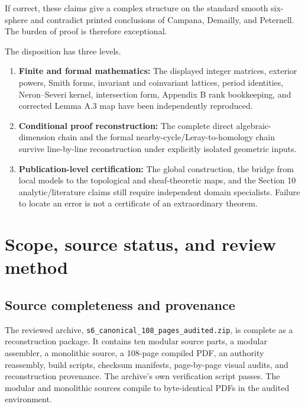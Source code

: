 \documentclass[
  10pt,
  letterpaper,
]{article}
\providecommand{\tightlist}{%
  \setlength{\itemsep}{0pt}\setlength{\parskip}{0pt}}
\begin{document}
If correct, these claims give a complex structure on the standard smooth
six-sphere and contradict printed conclusions of Campana, Demailly, and
Peternell. The burden of proof is therefore exceptional.

The disposition has three levels.

\begin{enumerate}
\def\labelenumi{\arabic{enumi}.}
\tightlist
\item
  \textbf{Finite and formal mathematics:} The displayed integer
  matrices, exterior powers, Smith forms, invariant and coinvariant
  lattices, period identities, Neron--Severi kernel, intersection form,
  Appendix B rank bookkeeping, and corrected Lemma A.3 map have been
  independently reproduced.
\item
  \textbf{Conditional proof reconstruction:} The complete direct
  algebraic-dimension chain and the formal
  nearby-cycle/Leray-to-homology chain survive line-by-line
  reconstruction under explicitly isolated geometric inputs.
\item
  \textbf{Publication-level certification:} The global construction, the
  bridge from local models to the topological and sheaf-theoretic maps,
  and the Section 10 analytic/literature claims still require
  independent domain specialists. Failure to locate an error is not a
  certificate of an extraordinary theorem.
\end{enumerate}

\section{Scope, source status, and review
method}\label{scope-source-status-and-review-method}

\subsection{Source completeness and
provenance}\label{source-completeness-and-provenance}

The reviewed archive, \texttt{s6\_canonical\_108\_pages\_audited.zip},
is complete as a reconstruction package. It contains ten modular source
parts, a modular assembler, a monolithic source, a 108-page compiled
PDF, an authority reassembly, build scripts, checksum manifests,
page-by-page visual audits, and reconstruction provenance. The archive's
own verification script passes. The modular and monolithic sources
compile to byte-identical PDFs in the audited environment.
\end{document}

